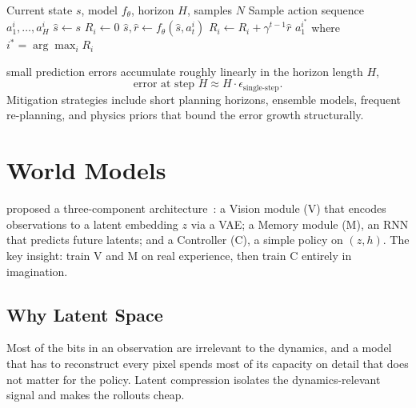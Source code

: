 \begin{algorithm}[H]
\caption{MPC with Learned Model}
\begin{algorithmic}[1]
\Require Current state $s$, model $f_\theta$, horizon $H$, samples $N$
    \State Sample action sequence $a_1^i, \ldots, a_H^i$
    \State $\hat{s} \gets s$
    \State $R_i \gets 0$
        \State $\hat{s}, \hat{r} \gets f_\theta(\hat{s}, a_t^i)$
        \State $R_i \gets R_i + \gamma^{t-1} \hat{r}$
    \EndFor
\EndFor
\State \Return $a_1^{i^*}$ where $i^* = \arg\max_i R_i$
\end{algorithmic}
\end{algorithm}

 small prediction errors accumulate roughly linearly in the horizon length $H$,
\begin{equation}
    \text{error at step } H \approx H \cdot \epsilon_{\text{single-step}}.
\end{equation}
Mitigation strategies include short planning horizons, ensemble models, frequent re-planning, and physics priors that bound the error growth structurally.


\section{World Models}


 proposed a three-component architecture~\cite{Ha2018WorldModels}: a Vision module (V) that encodes observations to a latent embedding $z$ via a VAE; a Memory module (M), an RNN that predicts future latents; and a Controller (C), a simple policy on $(z, h)$. The key insight: train V and M on real experience, then train C entirely in imagination.

\subsection{Why Latent Space}

 Most of the bits in an observation are irrelevant to the dynamics, and a model that has to reconstruct every pixel spends most of its capacity on detail that does not matter for the policy. Latent compression isolates the dynamics-relevant signal and makes the rollouts cheap.


